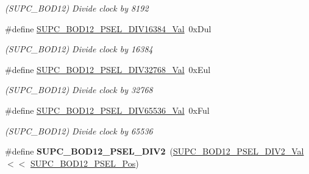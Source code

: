 \begin{DoxyCompactItemize}
\begin{DoxyCompactList}\small\item\em (S\+U\+P\+C\+\_\+\+B\+O\+D12) Divide clock by 8192 \end{DoxyCompactList}\item 
\hypertarget{group___s_a_m_l21___s_u_p_c_gabebe1d1c5049dd5ccb17409ee23f3230}{}\#define \hyperlink{group___s_a_m_l21___s_u_p_c_gabebe1d1c5049dd5ccb17409ee23f3230}{S\+U\+P\+C\+\_\+\+B\+O\+D12\+\_\+\+P\+S\+E\+L\+\_\+\+D\+I\+V16384\+\_\+\+Val}~0x\+Dul\label{group___s_a_m_l21___s_u_p_c_gabebe1d1c5049dd5ccb17409ee23f3230}

\begin{DoxyCompactList}\small\item\em (S\+U\+P\+C\+\_\+\+B\+O\+D12) Divide clock by 16384 \end{DoxyCompactList}\item 
\hypertarget{group___s_a_m_l21___s_u_p_c_ga38dccf3e9461788a2c3387858c502de4}{}\#define \hyperlink{group___s_a_m_l21___s_u_p_c_ga38dccf3e9461788a2c3387858c502de4}{S\+U\+P\+C\+\_\+\+B\+O\+D12\+\_\+\+P\+S\+E\+L\+\_\+\+D\+I\+V32768\+\_\+\+Val}~0x\+Eul\label{group___s_a_m_l21___s_u_p_c_ga38dccf3e9461788a2c3387858c502de4}

\begin{DoxyCompactList}\small\item\em (S\+U\+P\+C\+\_\+\+B\+O\+D12) Divide clock by 32768 \end{DoxyCompactList}\item 
\hypertarget{group___s_a_m_l21___s_u_p_c_ga51e557537f1fed24f892ba21371cb8bc}{}\#define \hyperlink{group___s_a_m_l21___s_u_p_c_ga51e557537f1fed24f892ba21371cb8bc}{S\+U\+P\+C\+\_\+\+B\+O\+D12\+\_\+\+P\+S\+E\+L\+\_\+\+D\+I\+V65536\+\_\+\+Val}~0x\+Ful\label{group___s_a_m_l21___s_u_p_c_ga51e557537f1fed24f892ba21371cb8bc}

\begin{DoxyCompactList}\small\item\em (S\+U\+P\+C\+\_\+\+B\+O\+D12) Divide clock by 65536 \end{DoxyCompactList}\item 
\hypertarget{group___s_a_m_l21___s_u_p_c_ga4f0f4e4fde0ed266c7548b08b4fb3091}{}\#define {\bfseries S\+U\+P\+C\+\_\+\+B\+O\+D12\+\_\+\+P\+S\+E\+L\+\_\+\+D\+I\+V2}~(\hyperlink{group___s_a_m_l21___s_u_p_c_ga08fa9ddbf10c1f608ad9c7515f30977f}{S\+U\+P\+C\+\_\+\+B\+O\+D12\+\_\+\+P\+S\+E\+L\+\_\+\+D\+I\+V2\+\_\+\+Val}      $<$$<$ \hyperlink{group___s_a_m_l21___s_u_p_c_ga43d50cdce3fb9ed37bfc9007dccac0d2}{S\+U\+P\+C\+\_\+\+B\+O\+D12\+\_\+\+P\+S\+E\+L\+\_\+\+Pos})\label{group___s_a_m_l21___s_u_p_c_ga4f0f4e4fde0ed266c7548b08b4fb3091}


\end{DoxyCompactItemize}
